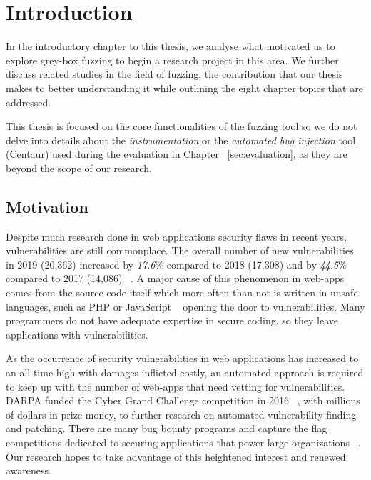 \chapter{Introduction}
\minitoc
\vspace*{1cm}

In the introductory chapter to this thesis, we analyse what motivated us to explore grey-box fuzzing to begin a research project in this area. We further discuss related studies in the field of fuzzing, the contribution that our thesis makes to better understanding it while outlining the eight chapter topics that are addressed.

This thesis is focused on the core functionalities of the fuzzing tool so we do not delve into details about the \emph{instrumentation} or the \emph{automated bug injection} tool (Centaur) used during the evaluation in Chapter ~\ref{sec:evaluation}, as they are beyond the scope of our research.

\section{Motivation}

Despite much research done in web applications security flaws in recent years, vulnerabilities are still commonplace. The overall number of new vulnerabilities in 2019 (20,362) increased by \emph{17.6}\% compared to 2018 (17,308) and by \emph{44.5}\% compared to 2017 (14,086) ~\cite{vulnerabilities2019state,owasp2017}. A major cause of this phenomenon in web-apps comes from the source code itself which more often than not is written in unsafe languages, such as PHP or JavaScript ~\cite{vulnerabilities2019state} opening the door to vulnerabilities. Many programmers do not have adequate expertise in secure coding, so they leave applications with vulnerabilities. 

As the occurrence of security vulnerabilities in web applications has increased to an all-time high with damages inflicted costly, an automated approach is required to keep up with the number of web-apps that need vetting for vulnerabilities. DARPA funded the Cyber Grand Challenge competition in 2016 ~\cite{darpa2016cgc}, with millions of dollars in prize money, to further research on automated vulnerability finding and patching. There are many bug bounty programs and capture the flag competitions dedicated to securing applications that power large organizations ~\cite{bugbounty}. Our research hopes to take advantage of this heightened interest and renewed awareness.

